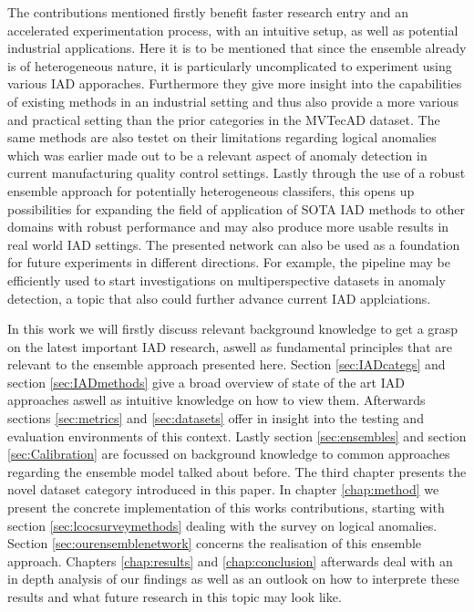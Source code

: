 The contributions mentioned firstly benefit faster research entry and an accelerated experimentation process, with an intuitive setup, 
as well as potential industrial applications. Here it is to be mentioned that since the ensemble already is of heterogeneous nature, it 
is particularly uncomplicated to experiment using various IAD apporaches.\newline
Furthermore they give more insight into the capabilities of existing methods in an industrial setting and thus also provide a more 
various and practical setting than the prior categories in the MVTecAD \cite{MVTEC_Bergmann_2021} dataset. The same methods are also testet on their limitations 
regarding logical anomalies which was earlier made out to be a relevant aspect of anomaly detection in current manufacturing quality control 
settings. Lastly through the use of a robust ensemble approach for potentially heterogeneous classifers, this opens up possibilities for expanding 
the field of application of SOTA IAD methods to other domains with robust performance and may also produce more usable results in real 
world IAD settings. The presented network can also be used as a foundation for future experiments in 
different directions. For example, the pipeline may be efficiently used to start investigations on multiperspective datasets in anomaly 
detection, a topic that also could further advance current IAD applciations.
\newline
\newline

In this work we will firstly discuss relevant background knowledge to get a grasp on the latest important IAD research, aswell as fundamental principles that are relevant to the ensemble 
approach presented here. Section \ref{sec:IADcategs} and section \ref{sec:IADmethods} give a broad overview of state of the art IAD approaches aswell as intuitive knowledge on how to 
view them. Afterwards sections \ref{sec:metrics} and \ref{sec:datasets} offer in insight into the testing and evaluation environments of this context. Lastly section \ref{sec:ensembles} and 
section \ref{sec:Calibration} are focussed on background knowledge to common approaches regarding the ensemble model talked about before.\newline
The third chapter presents the novel dataset category introduced in this paper.
In chapter \ref{chap:method} we present the concrete implementation of this works contributions, starting with section \ref{sec:lcocsurveymethods} dealing with the survey on logical anomalies. 
Section \ref{sec:ourensemblenetwork} concerns the realisation of this ensemble approach.
\newline 
Chapters \ref{chap:results} and \ref{chap:conclusion} afterwards deal with an in depth analysis of our findings as well as an outlook on how to interprete these results and what future research 
in this topic may look like.






